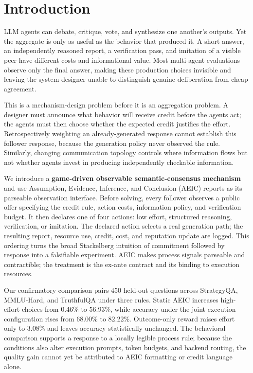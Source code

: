 \section{Introduction}
\label{sec:intro}

LLM agents can debate, critique, vote, and synthesize one another's outputs. Yet the aggregate is only as useful as the behavior that produced it. A short answer, an independently reasoned report, a verification pass, and imitation of a visible peer have different costs and informational value. Most multi-agent evaluations observe only the final answer, making these production choices invisible and leaving the system designer unable to distinguish genuine deliberation from cheap agreement.

This is a mechanism-design problem before it is an aggregation problem. A designer must announce what behavior will receive credit before the agents act; the agents must then choose whether the expected credit justifies the effort. Retrospectively weighting an already-generated response cannot establish this follower response, because the generation policy never observed the rule. Similarly, changing communication topology controls where information flows but not whether agents invest in producing independently checkable information.

We introduce a \textbf{game-driven observable semantic-consensus mechanism} and use Assumption, Evidence, Inference, and Conclusion (AEIC) reports as its parseable observation interface. Before solving, every follower observes a public offer specifying the credit rule, action costs, information policy, and verification budget. It then declares one of four actions: low effort, structured reasoning, verification, or imitation. The declared action selects a real generation path; the resulting report, resource use, credit, cost, and reputation update are logged. This ordering turns the broad Stackelberg intuition of commitment followed by response into a falsifiable experiment. AEIC makes process signals parseable and contractible; the treatment is the ex-ante contract and its binding to execution resources.

Our confirmatory comparison pairs 450 held-out questions across StrategyQA, MMLU-Hard, and TruthfulQA under three rules. Static AEIC increases high-effort choices from 0.46\% to 56.93\%, while accuracy under the joint execution configuration rises from 68.00\% to 82.22\%. Outcome-only reward raises effort only to 3.08\% and leaves accuracy statistically unchanged. The behavioral comparison supports a response to a locally legible process rule; because the conditions also alter execution prompts, token budgets, and backend routing, the quality gain cannot yet be attributed to AEIC formatting or credit language alone.

